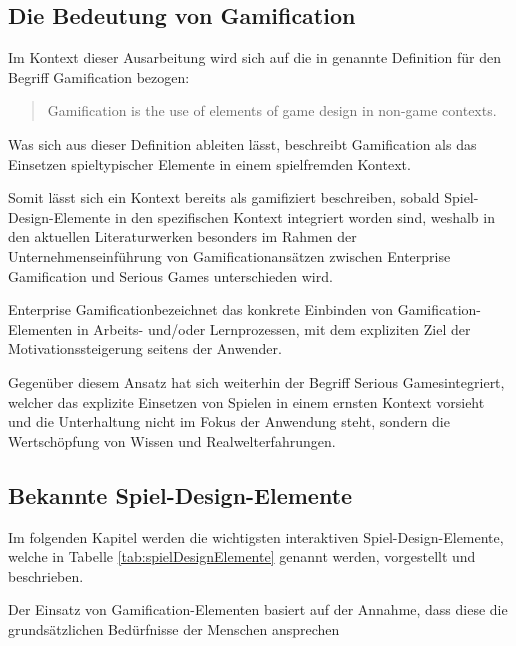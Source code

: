 \documentclass[bibliography=totoc,listof=totoc,BCOR=5mm,DIV=12,oneside]{scrbook}
\begin{document}
\subsection{Die Bedeutung von Gamification}
\par Im Kontext dieser Ausarbeitung wird sich auf die in \citep{deterding2011gamification} genannte Definition für den Begriff \grqq Gamification\grqq{} bezogen:
\begin{quotation} 
Gamification is the use of elements of game design in non-game contexts. 
\end{quotation}
\par Was sich aus dieser Definition ableiten lässt, beschreibt  Gamification als das Einsetzen spieltypischer Elemente in einem spielfremden Kontext.
\par Somit lässt sich ein Kontext bereits als \grqq gamifiziert\grqq{}
beschreiben, sobald Spiel-Design-Elemente in den spezifischen Kontext integriert worden sind, weshalb in den aktuellen Literaturwerken besonders im Rahmen der Unternehmenseinführung  von Gamificationansätzen zwischen Enterprise Gamification und Serious Games unterschieden wird\citep[vlg. Kapitel 1.1 Gamification: Definition und Abgrenzung, Seite 4]{Sailer2016}.
\par \bigskip \grqq Enterprise Gamification\grqq bezeichnet das konkrete Einbinden von Gamification-Elementen in Arbeits- und/oder Lernprozessen, mit dem expliziten Ziel der Motivationssteigerung seitens der Anwender.
\par \bigskip Gegenüber diesem Ansatz hat sich weiterhin der Begriff \grqq Serious Games\grqq integriert, welcher das explizite Einsetzen von Spielen in einem ernsten Kontext vorsieht und die Unterhaltung nicht im Fokus der Anwendung steht, sondern die Wertschöpfung von Wissen und Realwelterfahrungen. 

\subsection{Bekannte Spiel-Design-Elemente} \label{sub:grundlagenSpielDesignElemente}

\par Im folgenden Kapitel werden die wichtigsten interaktiven Spiel-Design-Elemente, welche in Tabelle \ref{tab:spielDesignElemente} genannt werden, vorgestellt und beschrieben. 
\par Der Einsatz von Gamification-Elementen basiert auf der Annahme, dass diese die grundsätzlichen Bedürfnisse der Menschen ansprechen\citep[Kapitel 1.1 Enterprise Gamification - Vorgehen und Anwendung, Seite 5]{Sailer2016}
\end{document}
